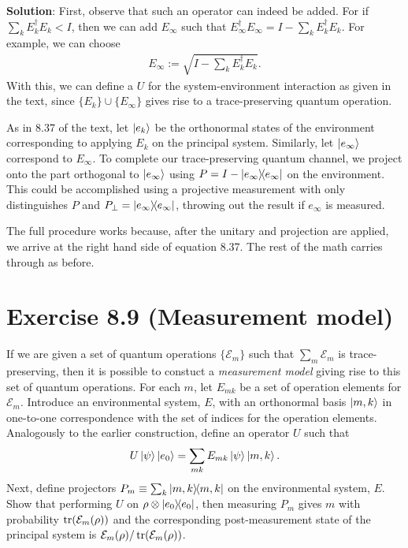 \documentclass{book}
\begin{document}
    \textbf{Solution}: First, observe that such an operator can indeed be added. For if $\sum_k E_k^\dagger E_k < I$, then we can add $E_\infty$ such that $E_\infty^\dagger E_\infty = I - \sum_k E_k^\dagger E_k$. For example, we can choose \begin{align}
        E_\infty := \sqrt{I- \sum_k E_k^\dagger E_k}. 
    \end{align}
    With this, we can define a $U$ for the system-environment interaction as given in the text, since $\{E_k\} \cup \{E_\infty\}$ gives rise to a trace-preserving quantum operation.

    As in 8.37 of the text, let $\ket{e_k}$ be the orthonormal states of the environment corresponding to applying $E_k$ on the principal system. Similarly, let $\ket{e_\infty}$ correspond to $E_\infty$. To complete our trace-preserving quantum channel, we project onto the part orthogonal to $\ket{e_\infty}$ using $P = I - \ketbra{e_\infty}$ on the environment. This could be accomplished using a projective measurement with only distinguishes $P$ and $P_\perp = \ketbra{e_\infty}$, throwing out the result if $e_\infty$ is measured. 

    The full procedure works because, after the unitary and projection are applied, we arrive at the right hand side of equation 8.37. The rest of the math carries through as before.

\section*{Exercise 8.9 (Measurement model)}
    If we are given a set of quantum operations $\{\mathcal{E}_m\}$ such that $\sum_m \mathcal{E}_m$ is trace-preserving, then it is possible to constuct a \emph{measurement model} giving rise to this set of quantum operations. For each $m$, let $E_{mk}$ be a set of operation elements for $\mathcal{E}_m$. Introduce an environmental system, $E$, with an orthonormal basis $\ket{m, k}$ in one-to-one correspondence with the set of indices for the operation elements. Analogously to the earlier construction, define an operator $U$ such that 
    \begin{align}
        U\ket{\psi}\ket{e_0} = \sum_{mk} E_{mk}\ket{\psi}\ket{m,k}.
    \end{align}
    Next, define projectors $P_m \equiv \sum_k \ketbra{m,k}$ on the environmental system, $E$. Show that performing $U$ on $\rho \otimes \ketbra{e_0}$, then measuring $P_m$ gives $m$ with probability $\tr(\mathcal{E}_m(\rho))$ and the corresponding post-measurement state of the principal system is $\mathcal{E}_m(\rho)/\tr(\mathcal{E}_m(\rho))$.
\end{document}
